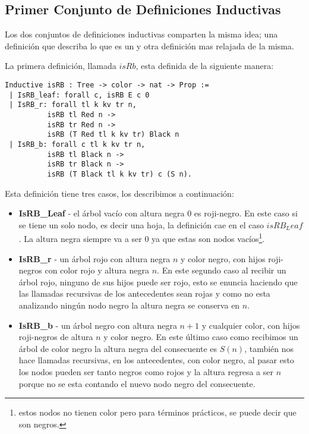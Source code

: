 \subsection{Primer Conjunto de Definiciones Inductivas}
Los dos conjuntos de definiciones inductivas comparten la misma idea; una definici\'on que
describa lo que es un {\arn} y otra definici\'on mas relajada de la misma.

La primera definici\'on, llamada $isRb$, esta definida de la siguiente manera:
\begin{verbatim}
Inductive isRB : Tree -> color -> nat -> Prop :=
 | IsRB_leaf: forall c, isRB E c 0
 | IsRB_r: forall tl k kv tr n,
          isRB tl Red n ->
          isRB tr Red n ->
          isRB (T Red tl k kv tr) Black n
 | IsRB_b: forall c tl k kv tr n,
          isRB tl Black n ->
          isRB tr Black n ->
          isRB (T Black tl k kv tr) c (S n).
\end{verbatim}
Esta definici\'on tiene tres casos, los describimos a continuaci\'on:
\begin{itemize}
        \item \textbf{IsRB\_Leaf} - el árbol vacío con altura negra 0 es roji-negro. En este caso
        si se tiene un solo nodo, es decir una hoja, la definici\'on cae en el caso $isRB_Leaf$.
        La altura negra siempre va a ser 0 ya que estas son nodos vacíos\footnote{estos nodos no
        tienen color pero para términos prácticos, se puede decir que son negros.}.
        \item \textbf{IsRB\_r} - un árbol rojo con altura negra $n$ y color negro, con hijos
        roji-negros con color rojo y altura negra $n$. En este segundo caso al recibir un \'arbol
        rojo, ninguno de sus hijos puede ser rojo, esto se enuncia haciendo que las llamadas
        recursivas de los antecedentes sean rojas y como no esta analizando ningún nodo negro la
        altura negra se conserva en $n$.
        \item \textbf{IsRB\_b} - un árbol negro con altura negra $n+1$ y cualquier color, con hijos
        roji-negros de altura $n$ y color negro. En este \'ultimo caso como recibimos un \'arbol
        de color negro la altura negra del consecuente es $S(n)$, también nos hace llamadas
        recursivas, en los antecedentes, con color negro, al pasar esto los nodos pueden ser tanto
        negros como rojos y la altura regresa a ser $n$ porque no se esta contando el nuevo nodo
        negro del consecuente.
\end{itemize}

